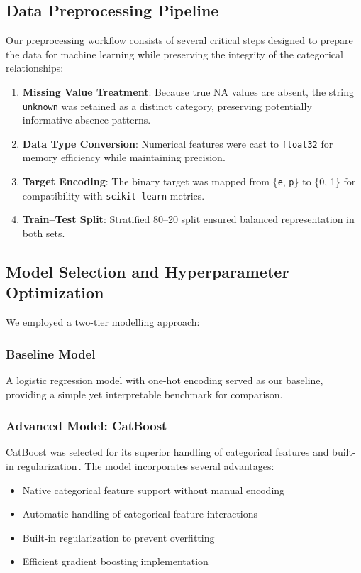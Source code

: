 \documentclass[11pt,a4paper]{article}
\begin{document}
\subsection{Data Preprocessing Pipeline}

Our preprocessing workflow consists of several critical steps designed to prepare the data for machine learning while preserving the integrity of the categorical relationships:

\begin{enumerate}
    \item \textbf{Missing Value Treatment}: Because true NA values are absent, the string \texttt{unknown} was retained as a distinct category, preserving potentially informative absence patterns.
    \item \textbf{Data Type Conversion}: Numerical features were cast to \texttt{float32} for memory efficiency while maintaining precision.
    \item \textbf{Target Encoding}: The binary target was mapped from \{\texttt{e}, \texttt{p}\} to \{0, 1\} for compatibility with \texttt{scikit-learn} metrics.
    \item \textbf{Train–Test Split}: Stratified 80–20 split ensured balanced representation in both sets.
\end{enumerate}

\subsection{Model Selection and Hyperparameter Optimization}

We employed a two-tier modelling approach:

\subsubsection{Baseline Model}
A logistic regression model with one-hot encoding served as our baseline, providing a simple yet interpretable benchmark for comparison.

\subsubsection{Advanced Model: CatBoost}
CatBoost was selected for its superior handling of categorical features and built-in regularization\,\cite{prokhorenkova2018catboost}. The model incorporates several advantages:

\begin{itemize}
    \item Native categorical feature support without manual encoding
    \item Automatic handling of categorical feature interactions
    \item Built-in regularization to prevent overfitting
    \item Efficient gradient boosting implementation
\end{itemize}
\end{document}
